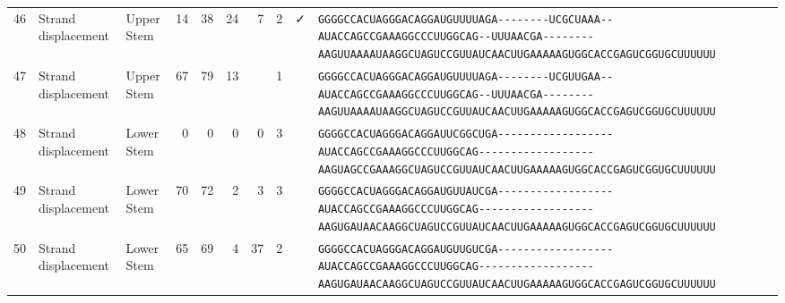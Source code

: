 \begin{tabular}{rllrrrrrcl}
 46 & Strand displacement & Upper Stem & 14 & 38 & 24 & 7 & 2 & ✓ &
 \color{ucsfdarkgrey}\verb|GGGGCCACUAGGGACAGGAU|\color{ucsforange}\verb|GUUUUA|\color{ucsfblue}\verb|GA--------UCGCUAAA--|\color{ucsfpurple}\verb|AUACCAGCCGAAAGGCCCUUGGCAG|\color{ucsfblue}\verb|--UUUAACGA--------AAGU|\color{ucsforange}\verb|UAAAAUAA|\color{ucsfnavy}\verb|GGCUAGUCC|\color{ucsforange}\verb|GUUAUCA|\color{ucsfteal}\verb|ACUUGAAAAAGU|\color{ucsforange}\verb|GGCACCGAGUCGGUGCUUUUUU| \\

 47 & Strand displacement & Upper Stem & 67 & 79 & 13 &  & 1 &  &
 \color{ucsfdarkgrey}\verb|GGGGCCACUAGGGACAGGAU|\color{ucsforange}\verb|GUUUUA|\color{ucsfblue}\verb|GA--------UCGUUGAA--|\color{ucsfpurple}\verb|AUACCAGCCGAAAGGCCCUUGGCAG|\color{ucsfblue}\verb|--UUUAACGA--------AAGU|\color{ucsforange}\verb|UAAAAUAA|\color{ucsfnavy}\verb|GGCUAGUCC|\color{ucsforange}\verb|GUUAUCA|\color{ucsfteal}\verb|ACUUGAAAAAGU|\color{ucsforange}\verb|GGCACCGAGUCGGUGCUUUUUU| \\

 48 & Strand displacement & Lower Stem & 0 & 0 & 0 & 0 & 3 &  &
 \color{ucsfdarkgrey}\verb|GGGGCCACUAGGGACAGGAU|\color{ucsforange}\verb|UCGGCU|\color{ucsfblue}\verb|GA------------------|\color{ucsfpurple}\verb|AUACCAGCCGAAAGGCCCUUGGCAG|\color{ucsfblue}\verb|------------------AAGU|\color{ucsforange}\verb|AGCCGAAA|\color{ucsfnavy}\verb|GGCUAGUCC|\color{ucsforange}\verb|GUUAUCA|\color{ucsfteal}\verb|ACUUGAAAAAGU|\color{ucsforange}\verb|GGCACCGAGUCGGUGCUUUUUU| \\

 49 & Strand displacement & Lower Stem & 70 & 72 & 2 & 3 & 3 &  &
 \color{ucsfdarkgrey}\verb|GGGGCCACUAGGGACAGGAU|\color{ucsforange}\verb|GUUAUC|\color{ucsfblue}\verb|GA------------------|\color{ucsfpurple}\verb|AUACCAGCCGAAAGGCCCUUGGCAG|\color{ucsfblue}\verb|------------------AAGU|\color{ucsforange}\verb|GAUAACAA|\color{ucsfnavy}\verb|GGCUAGUCC|\color{ucsforange}\verb|GUUAUCA|\color{ucsfteal}\verb|ACUUGAAAAAGU|\color{ucsforange}\verb|GGCACCGAGUCGGUGCUUUUUU| \\

 50 & Strand displacement & Lower Stem & 65 & 69 & 4 & 37 & 2 &  &
 \color{ucsfdarkgrey}\verb|GGGGCCACUAGGGACAGGAU|\color{ucsforange}\verb|GUUGUC|\color{ucsfblue}\verb|GA------------------|\color{ucsfpurple}\verb|AUACCAGCCGAAAGGCCCUUGGCAG|\color{ucsfblue}\verb|------------------AAGU|\color{ucsforange}\verb|GAUAACAA|\color{ucsfnavy}\verb|GGCUAGUCC|\color{ucsforange}\verb|GUUAUCA|\color{ucsfteal}\verb|ACUUGAAAAAGU|\color{ucsforange}\verb|GGCACCGAGUCGGUGCUUUUUU| \\


\end{tabular}
